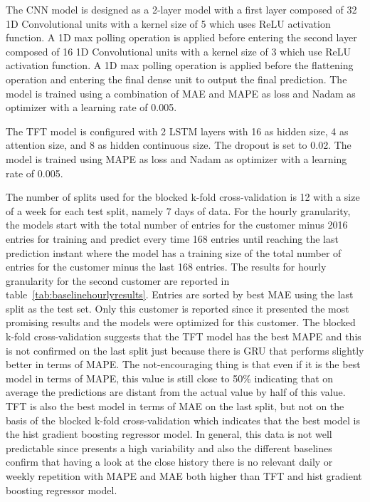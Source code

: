 The CNN model is designed as a 2-layer model with a first layer composed of 32 1D Convolutional units with a kernel size of 5 which uses ReLU activation function.
A 1D max polling operation is applied before entering the second layer composed of 16 1D Convolutional units with a kernel size of 3 which use ReLU activation function.
A 1D max polling operation is applied before the flattening operation and entering the final dense unit to output the final prediction.
The model is trained using a combination of MAE and MAPE as loss and Nadam as optimizer with a learning rate of 0.005.

The TFT model is configured with 2 LSTM layers with 16 as hidden size, 4 as attention size, and 8 as hidden continuous size.
The dropout is set to 0.02.
The model is trained using MAPE as loss and Nadam as optimizer with a learning rate of 0.005.

The number of splits used for the blocked k-fold cross-validation is 12 with a size of a week for each test split, namely 7 days of data.
For the hourly granularity, the models start with the total number of entries for the customer minus 2016 entries for training and predict every time 168 entries until reaching the last prediction instant where the model has a training size of the total number of entries for the customer minus the last 168 entries.
The results for hourly granularity for the second customer are reported in table~\ref{tab:baselinehourlyresults}.
Entries are sorted by best MAE using the last split as the test set.
Only this customer is reported since it presented the most promising results and the models were optimized for this customer.
The blocked k-fold cross-validation suggests that the TFT model has the best MAPE and this is not confirmed on the last split just because there is GRU that performs slightly better in terms of MAPE.
The not-encouraging thing is that even if it is the best model in terms of MAPE, this value is still close to 50\% indicating that on average the predictions are distant from the actual value by half of this value.
TFT is also the best model in terms of MAE on the last split, but not on the basis of the blocked k-fold cross-validation which indicates that the best model is the hist gradient boosting regressor model.
In general, this data is not well predictable since presents a high variability and also the different baselines confirm that having a look at the close history there is no relevant daily or weekly repetition with MAPE and MAE both higher than TFT and hist gradient boosting regressor model.

